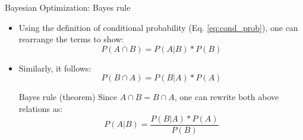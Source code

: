 \begin{frame}[c]{Bayesian Optimization: Bayes rule}

\begin{itemize}
    \item Using the definition of conditional probability (Eq. \ref{eq:cond_prob}), one can rearrange the terms to show:
        \begin{equation*}
            P(A \cap B) = P(A \vert B) * P(B)
        \end{equation*}
    \item Similarly, it follows:
        \begin{equation*}
            P(B \cap A) = P(B \vert A) * P(A)
        \end{equation*}
        
        \begin{block}{Bayes rule (theorem)}
        Since $A \cap B = B \cap A$, one can rewrite both above relations as:
        	\begin{equation}
        	    P(A \vert B) = \frac{P(B \vert A) * P(A)}{P(B)}
                \label{eq:bayes_rule}  
        	\end{equation}
        \end{block}

\end{itemize}
\end{frame}

